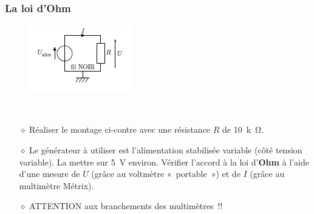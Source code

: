\documentclass[../main/main.tex]{subfiles}
\begin{document}
\subsubsection{La loi d'Ohm}
\begin{figure}
	\centering
	\includegraphics[width=\linewidth]{lohm}
\end{figure}
~\vspace{-20pt}
\begin{enumerate}
	\item[$\diamond$] Réaliser le montage ci-contre avec une résistance $R$ de
		\SI{10}{k\ohm}.
	\item[$\diamond$] Le générateur à utiliser est l'alimentation stabilisée variable (côté
		tension variable). La mettre sur \SI{5}{V} environ.
		\sqitem[1] Vérifier l'accord à la loi d'\textbf{Ohm} à l'aide d'une mesure de $U$
		(grâce au voltmètre «~portable~») et de $I$ (grâce au multimètre Métrix).
	\item[$\diamond$] ATTENTION aux branchements des multimètres~!!
\end{enumerate}
\end{document}

